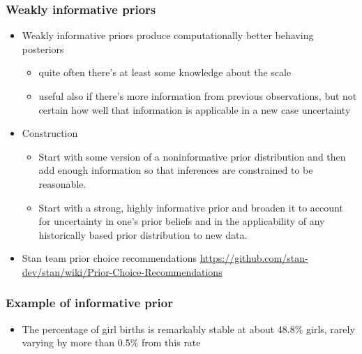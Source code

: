 \documentclass[english,t]{beamer}
\begin{document}
\begin{frame}

  \frametitle{Weakly informative priors}

  \begin{itemize}
  \item Weakly informative priors produce computationally better
    behaving posteriors
    \begin{itemize}
    \item quite often there's at least some knowledge about the
      scale
    \item useful also if there's more information from previous
      observations, but not certain how well that information is
      applicable in a new case uncertainty
    \end{itemize}
    \pause
    \item Construction
      \begin{itemize}
      \item Start with some version of a noninformative prior distribution and then add enough
        information so that inferences are constrained to be reasonable.
      \item Start with a strong, highly informative prior and broaden it to account for uncertainty
        in one's prior beliefs and in the applicability of any historically based prior distribution
        to new data.
      \end{itemize}
    \item Stan team prior choice recommendations \url{https://github.com/stan-dev/stan/wiki/Prior-Choice-Recommendations}
  \end{itemize}

\end{frame}

\begin{frame}

  \frametitle{Example of informative prior}
  
  \begin{itemize}
  \item The percentage of girl births is remarkably stable at about
    48.8\% girls, rarely varying by more than 0.5\% from this rate
  \end{itemize}
  \begin{center}
  \end{center}
\end{frame}
\end{document}
